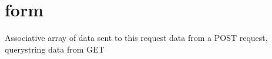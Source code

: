 \hypertarget{form-example}{
\section{form}
}
Associative array of data sent to this request data from a POST request, querystring data from GET


\begin{DoxyCodeInclude}
\end{DoxyCodeInclude}
 